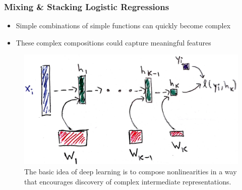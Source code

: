 \documentclass[10pt,mathserif]{beamer}
\begin{document}
\begin{frame}
  \frametitle{Mixing \& Stacking Logistic Regressions}
  \begin{itemize}
  \item Simple combinations of simple functions can quickly become complex
  \item These complex compositions could capture meaningful features
  \end{itemize}
  \begin{figure}
    \centering
    \includegraphics[width=0.7\paperwidth]{figure/deep_learning_basic}
    \caption{The basic idea of deep learning is to compose nonlinearities in a
      way that encourages discovery of complex intermediate representations.
      \label{fig:deep_learning_basic} }
  \end{figure}
\end{frame}
\end{document}
